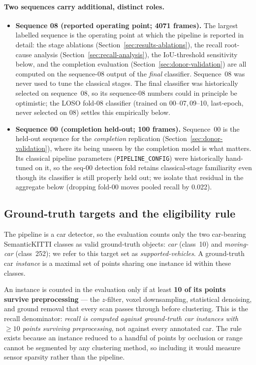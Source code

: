 \paragraph{Two sequences carry additional, distinct roles.}
\begin{itemize}
  \item \textbf{Sequence 08 (reported operating point; \num{4071} frames).} The
    largest labelled sequence is the operating point at which the pipeline is
    reported in detail: the stage ablations (Section~\ref{sec:results-ablations}),
    the recall root-cause analysis (Section~\ref{sec:recall-analysis}), the
    IoU-threshold sensitivity below, and the completion evaluation
    (Section~\ref{sec:donor-validation}) are all computed on the sequence-08 output
    of the \emph{final} classifier. Sequence~08 was never used to tune the
    classical stages. The final classifier was historically selected on
    sequence~08, so its sequence-08 numbers could in principle be optimistic; the
    LOSO fold-08 classifier (trained on \numrange{00}{07},\,\numrange{09}{10},
    last-epoch, never selected on 08) settles this empirically below.
  \item \textbf{Sequence 00 (completion held-out; 100 frames).} Sequence~00 is
    the held-out sequence for the \emph{completion} replication
    (Section~\ref{sec:donor-validation}), where its being unseen by the completion
    model is what matters. Its classical pipeline parameters
    (\texttt{PIPELINE\_CONFIG}) were historically hand-tuned on it, so the
    seq-00 detection fold retains classical-stage familiarity even though its
    classifier is still properly held out; we isolate that residual in the
    aggregate below (dropping fold-00 moves pooled recall by \num{0.022}).
\end{itemize}

\subsection{Ground-truth targets and the eligibility rule}
\label{sec:eval-targets}

The pipeline is a car detector, so the evaluation counts only the two
car-bearing SemanticKITTI classes as valid ground-truth objects:
\emph{car} (class~10) and \emph{moving-car} (class~252); we refer to this target
set as \emph{supported-vehicles}. A ground-truth car \emph{instance} is a
maximal set of points sharing one instance id within these classes.

An instance is counted in the evaluation only if at least \textbf{10 of its
points survive preprocessing} --- the $z$-filter, voxel downsampling, statistical
denoising, and ground removal that every scan passes through before clustering.
This is the recall denominator: \emph{recall is computed against ground-truth car
instances with $\geq 10$ points surviving preprocessing}, not against every
annotated car. The rule exists because an instance reduced to a handful of points
by occlusion or range cannot be segmented by any clustering method, so including
it would measure sensor sparsity rather than the pipeline.

